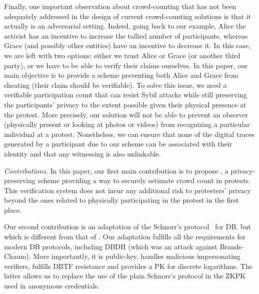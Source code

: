 Finally, one important observation about crowd-counting that has not been adequately addressed in the design of current crowd-counting solutions is that it actually is an adversarial setting. 
Indeed, going back to our example, Alice the activist has an incentive to increase the tallied number of participants, whereas Grace (and possibly other entities) have an incentive to decrease it.
In this case, we are left with two options: either we trust Alice or Grace (or another third party), or we have to be able to verify their claims ourselves.
In this paper, our main objective is to provide a scheme preventing both Alice and Grace from cheating (\ie their claim should be verifiable).
To solve this issue, we need a verifiable participation count that can resist Sybil attacks while still preserving the participants' privacy to the extent possible given their physical presence at the protest. 
More precisely, our solution will not be able to prevent an observer (physically present or looking at photos or videos) from recognizing a particular individual at a protest. 
Nonetheless, we can ensure that none of the digital traces generated by a participant due to our scheme can be associated with 
their identity and that any witnessing is also unlinkable.

\emph{Contributions.} In this paper, our first main contribution is to propose \PRIVO, a privacy-preserving scheme providing a way to securely estimate crowd count in protests.
This verification system does not incur any additional risk to protesters' privacy beyond the ones related to physically participating in the protest in the first place.

Our second contribution is an adaptation of the Schnorr's protocol~\cite{Schnorr} for \ac{DB}, but which is different from that of \textcite{DistanceBounding}.
Our adaptation fulfills all the requirements for modern \ac{DB} protocols, including \ac{DBDH} (which was an attack against Brands-Chaum).
More importantly, it is public-key, handles malicious impersonating verifiers, fulfills \ac{DBTF} resistance and provides a \ac{PK} for discrete logarithms.
The latter allows us to replace the use of the plain Schnorr's protocol in the 
\ac{ZKPK} used in anonymous credentials.

